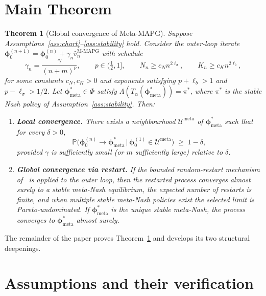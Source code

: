\documentclass[11pt]{article}
\newtheorem{theorem}{Theorem}
\theoremstyle{definition}
\theoremstyle{remark}
\newcommand{\meta}{\mathrm{meta}}
\newcommand{\MAPG}{\text{M-MAPG}}
\newcommand{\Prob}{\mathbb{P}}
\begin{document}
\section{Main Theorem}
\label{sec:main}

\begin{theorem}[Global convergence of Meta-MAPG]\label{thm:main}
Suppose Assumptions~\ref{ass:chart}--\ref{ass:stability} hold.  Consider
the outer-loop iterate
$\bm\phi_0^{(n+1)}=\bm\phi_0^{(n)}+\gamma_n\hat v_n^{\MAPG}$ with
schedule
\begin{equation}
  \gamma_n=\frac{\gamma}{(n+m)^p},\qquad p\in(\tfrac12,1],\qquad
  N_n\ge c_N n^{2\ell_\sigma},\qquad K_n\ge c_K n^{2\ell_b},
  \label{eq:rates}
\end{equation}
for some constants $c_N,c_K>0$ and exponents satisfying $p+\ell_b>1$
and $p-\ell_\sigma>1/2$.  Let $\bm\phi_\meta^*\in\Phi$ satisfy
$\Lambda(T_\alpha(\bm\phi_\meta^*))=\pi^*$, where $\pi^*$ is the stable
Nash policy of Assumption~\ref{ass:stability}.  Then:
\begin{enumerate}[leftmargin=1.4em,itemsep=2pt]
\item \textbf{Local convergence.}  There exists a neighbourhood
      $\mathcal U^\meta$ of $\bm\phi_\meta^*$ such that for every
      $\delta>0$,
      \[
        \Prob\!\big(\bm\phi_0^{(n)}\to\bm\phi_\meta^*\,\big|\,\bm\phi_0^{(1)}\in\mathcal U^\meta\big)\;\ge\;1-\delta,
      \]
      provided $\gamma$ is sufficiently small (or $m$ sufficiently large) relative to $\delta$.
\item \textbf{Global convergence via restart.}  If the bounded
      random-restart mechanism of~\citet[\S4]{giannou2022convergence}
      is applied to the outer loop, then the restarted process
      converges almost surely to a stable meta-Nash equilibrium, the
      expected number of restarts is finite, and when multiple stable
      meta-Nash policies exist the selected limit is
      Pareto-undominated.  If $\bm\phi_\meta^*$ is the unique stable
      meta-Nash, the process converges to $\bm\phi_\meta^*$ almost
      surely.
\end{enumerate}
\end{theorem}

The remainder of the paper proves Theorem~\ref{thm:main} and develops
its two structural deepenings.

\section{Assumptions and their verification}
\label{sec:assumptions}
\end{document}
